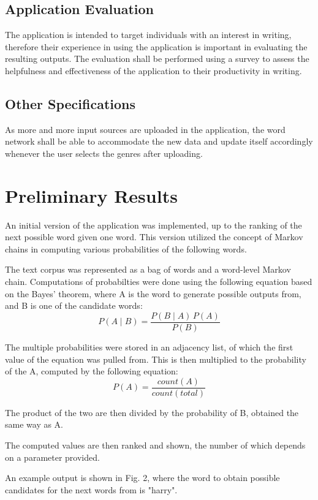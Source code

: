 \documentclass[journal]{./IEEE/IEEEtran}
\begin{document}
\subsection{Application Evaluation}
The application is intended to target individuals with an interest in writing, therefore their experience in using the application is important in evaluating the resulting outputs. The evaluation shall be performed using a survey to assess the helpfulness and effectiveness of the application to their productivity in writing.

\subsection{Other Specifications}
As more and more input sources are uploaded in the application, the word network shall be able to accommodate the new data and update itself accordingly whenever the user selects the genres after uploading.

\section{Preliminary Results}
An initial version of the application was implemented, up to the ranking of the next possible word given one word. This version utilized the concept of Markov chains in computing various probabilities of the following words.

The text corpus was represented as a bag of words and a word-level Markov chain. Computations of probabilties were done using the following equation based on the Bayes' theorem, where A is the word to generate possible outputs from, and B is one of the candidate words:
$$ P(A \mid B) = \frac{P(B \mid A) \, P(A)}{P(B)} $$


The multiple probabilities were stored in an adjacency list, of which the first value of the equation was pulled from. This is then multiplied to the probability of the A, computed by the following equation:
$$ P(A) = \frac{count(A)}{count(total)} $$

The product of the two are then divided by the probability of B, obtained the same way as A.

The computed values are then ranked and shown, the number of which depends on a parameter provided.

An example output is shown in Fig. 2, where the word to obtain possible candidates for the next words from is "harry".
\end{document}
